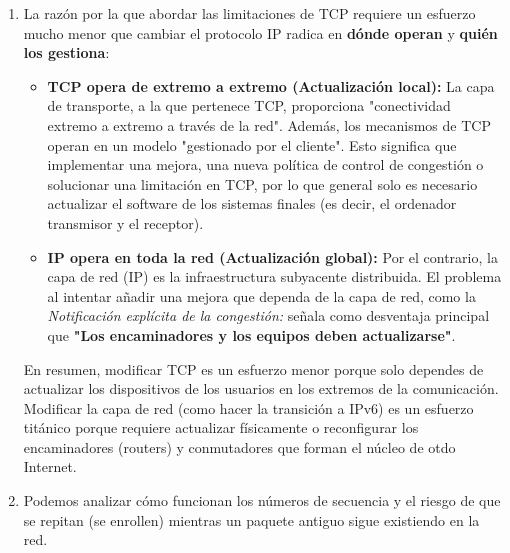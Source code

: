 \begin{enumerate}[label=\color{red}\textbf{\arabic*)}]
	\item {}

	      La razón por la que abordar las limitaciones de TCP requiere un esfuerzo mucho menor que cambiar el protocolo IP radica en \textbf{dónde operan} y \textbf{quién los gestiona}:
	      \begin{itemize}[label=\textbullet]
		      \item \textbf{TCP opera de extremo a extremo (Actualización local):} La capa de transporte, a la que pertenece TCP, proporciona "conectividad extremo a extremo a través de la red". Además, los mecanismos de TCP operan en un modelo "gestionado por el cliente". Esto significa que implementar una mejora, una nueva política de control de congestión o solucionar una limitación en TCP, por lo que general solo es necesario actualizar el software de los sistemas finales (es decir, el ordenador transmisor y el receptor).
		      \item \textbf{IP opera en toda la red (Actualización global):} Por el contrario, la capa de red (IP) es la infraestructura subyacente distribuida. El problema al intentar añadir una mejora que dependa de la capa de red, como la \textit{Notificación explícita de la congestión:} señala como desventaja principal que \textbf{"Los encaminadores y los equipos deben actualizarse"}.
	      \end{itemize}
	      En resumen, modificar TCP es un esfuerzo menor porque solo dependes de actualizar los dispositivos de los usuarios en los extremos de la comunicación. Modificar la capa de red (como hacer la transición a IPv6) es un esfuerzo titánico porque requiere actualizar físicamente o reconfigurar los encaminadores (routers) y conmutadores que forman el núcleo de otdo Internet.
	\item {}

	      Podemos analizar cómo funcionan los números de secuencia y el riesgo de que se repitan (se enrollen) mientras un paquete antiguo sigue existiendo en la red.


\end{enumerate}
